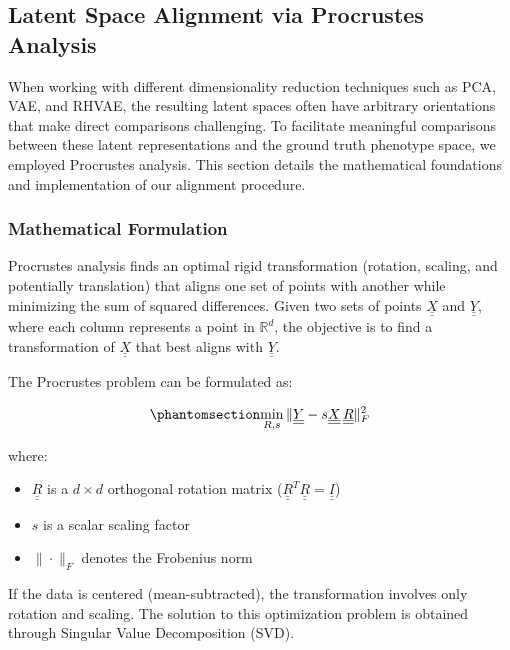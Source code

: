 \documentclass[
]{scrartcl}
\providecommand{\tightlist}{%
  \setlength{\itemsep}{0pt}\setlength{\parskip}{0pt}}\usepackage{longtable,booktabs,array}
\begin{document}
\begin{refsection}
\subsection{Latent Space Alignment via Procrustes
Analysis}\label{latent-space-alignment-via-procrustes-analysis}

When working with different dimensionality reduction techniques such as
PCA, VAE, and RHVAE, the resulting latent spaces often have arbitrary
orientations that make direct comparisons challenging. To facilitate
meaningful comparisons between these latent representations and the
ground truth phenotype space, we employed Procrustes analysis. This
section details the mathematical foundations and implementation of our
alignment procedure.

\subsubsection{Mathematical Formulation}\label{mathematical-formulation}

Procrustes analysis finds an optimal rigid transformation (rotation,
scaling, and potentially translation) that aligns one set of points with
another while minimizing the sum of squared differences. Given two sets
of points \(\underline{\underline{X}}\) and
\(\underline{\underline{Y}}\), where each column represents a point in
\(\mathbb{R}^d\), the objective is to find a transformation of
\(\underline{\underline{X}}\) that best aligns with
\(\underline{\underline{Y}}\).

The Procrustes problem can be formulated as:

\begin{equation}\phantomsection\label{eq-procrustes}{
\min_{R, s} \|
    \underline{\underline{Y}} - 
    s\underline{\underline{X}}\,\underline{\underline{R}}
\|_F^2
}\end{equation}

where:

\begin{itemize}
\tightlist
\item
  \(\underline{\underline{R}}\) is a \(d \times d\) orthogonal rotation
  matrix (\(\underline{\underline{R}}^T\underline{\underline{R}} =
  \underline{\underline{I}}\))
\item
  \(s\) is a scalar scaling factor
\item
  \(\|\cdot\|_F\) denotes the Frobenius norm
\end{itemize}

If the data is centered (mean-subtracted), the transformation involves
only rotation and scaling. The solution to this optimization problem is
obtained through Singular Value Decomposition (SVD).


\end{refsection}
\end{document}
